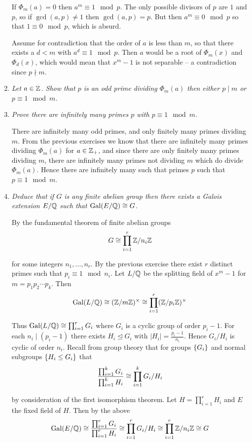 \documentclass[10pt]{article}
\begin{document}
\begin{enumerate}
If $\Phi_m(a) = 0$ then $a^m \equiv 1 \mod p$.  The only possible divisors of $p$ are $1$ and $p$, so if $\gcd(a,p) \neq 1$ then $\gcd(a,p) = p$.  But then $a^m \equiv 0 \mod p$ so that $1 \equiv 0 \mod p$, which is absurd.

Assume for contradiction that the order of $a$ is less than $m$, so that there exists a $d < m$ with $a^d \equiv 1 \mod p$.  Then $a$ would be a root of $\Phi_m(x)$ and $\Phi_d(x)$, which would mean that $x^m - 1$ is not separable -- a contradiction since $p \nmid m$.

\item \emph{Let $a \in \mathbb{Z}$.  Show that $p$ is an odd prime dividing $\Phi_m(a)$ then either $p \mid m$ or $p \equiv 1 \mod m$.}
\item \emph{Prove there are infinitely many primes $p$ with $p \equiv 1 \mod m$.}

There are infinitely many odd primes, and only finitely many primes dividing $m$.  From the previous exercises we know that there are infinitely many primes dividing $\Phi_m(a)$ for $a \in \mathbb{Z}_+$, and since there are only finitely many primes dividing $m$, there are infinitely many primes not dividing $m$ which do divide $\Phi_m(a)$.  Hence there are infinitely many such that primes $p$ such that $p \equiv 1 \mod m$.

\item \emph{Deduce that if $G$ is any finite abelian group then there exists a Galois extension $E/\mathbb{Q}$ such that $\operatorname{Gal}(E/\mathbb{Q}) \cong G$.}

By the fundamental theorem of finite abelian groups 
\[
G \cong \prod_{i=1}^r \mathbb{Z}/n_i\mathbb{Z}
\]

for some integers $n_1, \ldots, n_r$.  By the previous exercise there exist $r$ distinct primes such that $p_i \equiv 1 \mod n_i$.  Let $L/\mathbb{Q}$ be the splitting field of $x^m - 1$ for $m = p_1p_2 \cdots p_k$.  Then
\[
\operatorname{Gal}(L/\mathbb{Q}) \cong (\mathbb{Z}/m\mathbb{Z})^\times \cong \prod_{i=1}^r (\mathbb{Z}/p_i\mathbb{Z})^\times
\]

Thus $\operatorname{Gal}(L/\mathbb{Q}) \cong \prod_{i=1}^r G_i$ where $G_i$ is a cyclic group of order $p_i - 1$.  For each $n_i \mid (p_i - 1)$ there exists $H_i \unlhd G_i$ with $|H_i| = \frac{p_i - 1}{n_i}$.  Hence $G_i / H_i$ is cyclic of order $n_i$.  Recall from group theory that for groups $\left\{ G_i \right\}$ and normal subgroups $\left\{ H_i \leq G_i \right\}$ that
\[
\frac{\prod_{i=1}^k G_i}{\prod_{i=1}^k H_i} \cong \prod_{i=1}^k G_i/H_i
\]

by consideration of the first isomorphism theorem.  Let $H = \prod_{i=1}^r H_i$ and $E$ the fixed field of $H$. Then by the above
\[
\operatorname{Gal}(E/\mathbb{Q}) \cong \frac{\prod_{i=1}^r G_i}{\prod_{i=1}^r H_i} \cong \prod_{i=1}^r G_i/H_i \cong \prod_{i=1}^r \mathbb{Z}/n_i\mathbb{Z} \cong G
\]
\end{enumerate}
\end{document}

